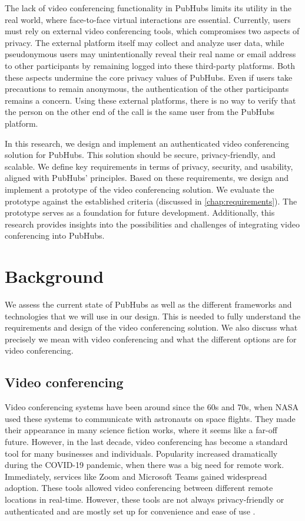 \documentclass{report}
\begin{document}
The lack of video conferencing functionality in PubHubs limits its utility in the real world, where face-to-face
virtual interactions are essential. Currently, users must rely on external video conferencing tools, which compromises
two aspects of privacy. The external platform itself may collect and analyze user data, while pseudonymous users may
unintentionally reveal their real name or email address to other participants by remaining logged into these third-party
platforms. Both these aspects undermine the core privacy values of PubHubs. Even if users take precautions to remain
anonymous, the authentication of the other participants remains a concern. Using these external platforms, there is no
way to verify that the person on the other end of the call is the same user from the PubHubs platform.

In this research, we design and implement an authenticated video conferencing solution for PubHubs. This
solution should be secure, privacy-friendly, and scalable. We define key requirements in terms of privacy,
security, and usability, aligned with PubHubs’ principles. Based on these requirements, we design and implement
a prototype of the video conferencing solution. We evaluate the prototype against the established
criteria (discussed in \autoref{chap:requirements}). The prototype serves as a foundation for future development.
Additionally, this research provides insights into the possibilities and challenges of integrating video
conferencing into PubHubs.

\chapter{Background}
We assess the current state of PubHubs as well as the different frameworks and technologies that we will use in
our design. This is needed to fully understand the requirements and design of the video conferencing solution. We
also discuss what precisely we mean with video conferencing and what the different options are for video
conferencing.

\section{Video conferencing}
Video conferencing systems have been around since the 60s and 70s, when NASA used these systems to communicate with
astronauts on space flights. They made their appearance in many science fiction works, where it seems like a far-off
future. However, in the last decade, video conferencing has become a standard tool for many businesses and individuals.
Popularity increased dramatically during the COVID-19 pandemic, when there was a big need for remote work.
Immediately, services like Zoom \cite{noauthor_one_nodate} and Microsoft Teams  \cite{noauthor_microsoft_nodate} gained
widespread adoption. These tools allowed video conferencing between different remote locations in real-time.
However, these tools are not always privacy-friendly or authenticated and are mostly set up for convenience and ease
of use \cite{gauthier_dynamic_2021}.
\end{document}
